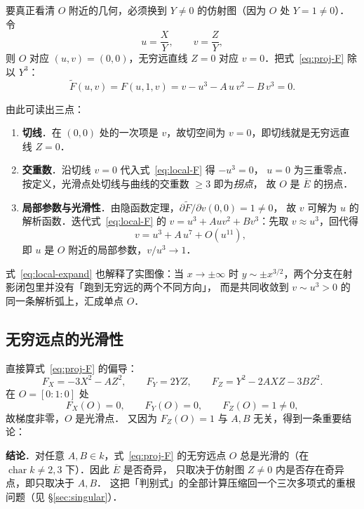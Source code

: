\documentclass[10pt,a4paper]{article}
\numberwithin{equation}{section}
\begin{document}
要真正看清 $O$ 附近的几何，必须换到 $Y\neq0$ 的仿射图（因为 $O$ 处 $Y=1\neq0$）．
令
\[
u=\frac{X}{Y},\qquad v=\frac{Z}{Y},
\]
则 $O$ 对应 $(u,v)=(0,0)$，无穷远直线 $Z=0$ 对应 $v=0$．把式~\eqref{eq:proj-F} 除以 $Y^{3}$：
\begin{equation}\label{eq:local-F}
\widetilde F(u,v)=F(u,1,v)=v-u^{3}-A\,u\,v^{2}-B\,v^{3}=0 .
\end{equation}

由此可读出三点：

\begin{enumerate}
\item \textbf{切线}．在 $(0,0)$ 处的一次项是 $v$，故切空间为 $v=0$，即切线就是无穷远直线 $Z=0$．
\item \textbf{交重数}．沿切线 $v=0$ 代入式~\eqref{eq:local-F} 得 $-u^{3}=0$，
   $u=0$ 为三重零点．按定义，光滑点处切线与曲线的交重数 $\geq3$ 即为\emph{拐点}，
   故 $O$ 是 $\overline E$ 的拐点．
\item \textbf{局部参数与光滑性}．由隐函数定理，$\partial\widetilde F/\partial v(0,0)=1\neq0$，
   故 $v$ 可解为 $u$ 的解析函数．迭代式~\eqref{eq:local-F} 的
   $v=u^{3}+Auv^{2}+Bv^{3}$：先取 $v\approx u^{3}$，回代得
   \begin{equation}\label{eq:local-expand}
   v=u^{3}+A\,u^{7}+O(u^{11}),
   \end{equation}
   即 $u$ 是 $O$ 附近的局部参数，$v/u^{3}\to1$．
\end{enumerate}

式~\eqref{eq:local-expand} 也解释了实图像：当 $x\to\pm\infty$ 时
$y\sim\pm x^{3/2}$，两个分支在射影闭包里并没有「跑到无穷远的两个不同方向」，
而是共同收敛到 $v\sim u^{3}>0$ 的同一条解析弧上，汇成单点 $O$．

\subsection{无穷远点的光滑性}

直接算式~\eqref{eq:proj-F} 的偏导：
\begin{equation}\label{eq:partials}
F_{X}=-3X^{2}-AZ^{2},\qquad
F_{Y}=2YZ,\qquad
F_{Z}=Y^{2}-2AXZ-3BZ^{2}.
\end{equation}
在 $O=[0:1:0]$ 处
\[
F_{X}(O)=0,\qquad F_{Y}(O)=0,\qquad F_{Z}(O)=1\neq0 ,
\]
故梯度非零，$O$ 是光滑点．
又因为 $F_{Z}(O)=1$ 与 $A,B$ 无关，得到一条重要结论：

\begin{framed}
\noindent\textbf{结论}．对任意 $A,B\in k$，式~\eqref{eq:proj-F} 的无穷远点 $O$
总是光滑的（在 $\operatorname{char}k\neq 2,3$ 下）．因此 $\overline E$ 是否奇异，
只取决于仿射图 $Z\neq0$ 内是否存在奇异点，即只取决于 $A,B$．
这把「判别式」的全部计算压缩回一个三次多项式的重根问题（见 \S\ref{sec:singular}）．
\end{framed}
\end{document}
